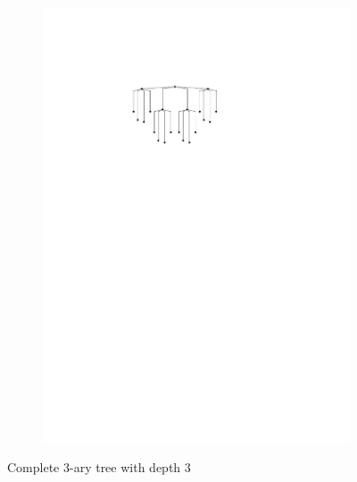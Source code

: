 \begin{figure}[H]
	\centering
	\begin{subfigure}{0.8\linewidth}
		\centering
		\includegraphics[width=\textwidth,page=2]{drawings/4-ary_tree.pdf}
	\end{subfigure}
	\caption{Complete 3-ary tree with depth 3}\label{im:4-ary_d=2}
\end{figure}
